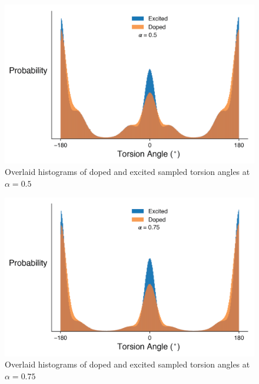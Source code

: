 \begin{figure}[hbt!]
    \centering
    \includegraphics{figures/append_tor_model/a_050_hist.png}
    \caption[Histogram of Doped and Excited Sampled Torsion Angles at $\alpha = 0.5$]{Overlaid histograms of doped and excited sampled torsion angles at $\alpha = 0.5$}
    \label{fig:a_050_hist}
\end{figure}

\begin{figure}[hbt!]
    \centering
    \includegraphics{figures/append_tor_model/a_075_hist.png}
    \caption[Histogram of Doped and Excited Sampled Torsion Angles at $\alpha = 0.75$]{Overlaid histograms of doped and excited sampled torsion angles at $\alpha = 0.75$}
    \label{fig:a_075_hist}
\end{figure}

